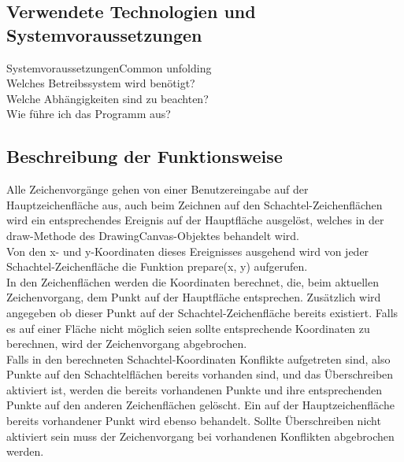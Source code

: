 \subsection{Verwendete Technologien und Systemvoraussetzungen}
\label{subsec:technologien}


SystemvoraussetzungenCommon unfolding\\
Welches Betreibssystem wird benötigt?\\
Welche Abhängigkeiten sind zu beachten?\\
Wie führe ich das Programm aus?\\


\subsection{Beschreibung der Funktionsweise}
\label{subsec:funktionsweise}

Alle Zeichenvorgänge gehen von einer Benutzereingabe auf der Hauptzeichenfläche aus, auch beim Zeichnen auf den Schachtel-Zeichenflächen wird ein entsprechendes Ereignis auf der Hauptfläche ausgelöst, welches in der draw-Methode des DrawingCanvas-Objektes behandelt wird.\\

Von den x- und y-Koordinaten dieses Ereignisses ausgehend wird von jeder Schachtel-Zeichenfläche die Funktion prepare(x, y) aufgerufen.\\

In den Zeichenflächen werden die Koordinaten berechnet, die, beim aktuellen Zeichenvorgang, dem Punkt auf der Hauptfläche entsprechen. Zusätzlich wird angegeben ob dieser Punkt auf der Schachtel-Zeichenfläche bereits existiert. Falls es auf einer Fläche nicht möglich seien sollte entsprechende Koordinaten zu berechnen, wird der Zeichenvorgang abgebrochen.\\

Falls in den berechneten Schachtel-Koordinaten Konflikte aufgetreten sind, also Punkte auf den Schachtelflächen bereits vorhanden sind, und das Überschreiben aktiviert ist, werden die bereits vorhandenen Punkte und ihre entsprechenden Punkte auf den anderen Zeichenflächen gelöscht. Ein auf der Hauptzeichenfläche bereits vorhandener Punkt wird ebenso behandelt. Sollte Überschreiben nicht aktiviert sein muss der Zeichenvorgang bei vorhandenen Konflikten abgebrochen werden.\\


